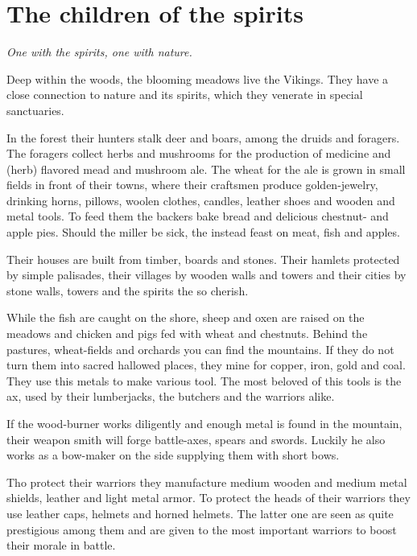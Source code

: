 \section{The children of the spirits}\label{ch:Tribes:Vikings}

\begin{flushright}
	\emph{One with the spirits, one with nature.}
\end{flushright}

Deep within the woods, the blooming meadows live the \gls*{Vikings}. They have a
close connection to nature and its spirits, which they venerate in special
sanctuaries.

In the forest their hunters stalk deer and boars, among the druids and
foragers. The foragers collect herbs and mushrooms for the production of
medicine and (herb) flavored mead and mushroom ale. The wheat for the ale is
grown in small fields in front of their towns, where their craftsmen produce
golden-jewelry, drinking horns, pillows, woolen clothes, candles, leather shoes
and wooden and metal tools. To feed them the backers bake bread and delicious
chestnut- and apple pies. Should the miller be sick, the instead feast on meat,
fish and apples.

Their houses are built from timber, boards and stones. Their hamlets protected
by simple palisades, their villages by wooden walls and towers and their cities
by stone walls, towers and the spirits the so cherish.

While the fish are caught on the shore, sheep and oxen are raised on the
meadows and chicken and pigs fed with wheat and chestnuts. Behind the pastures,
wheat-fields and orchards you can find the mountains. If they do not turn them
into sacred hallowed places, they mine for copper, iron, gold and coal. They
use this metals to make various tool. The most beloved of this tools is the ax,
used by their lumberjacks, the butchers and the warriors alike.

If the wood-burner works diligently and enough metal is found in the mountain,
their weapon smith will forge battle-axes, spears and swords. Luckily he also
works as a bow-maker on the side supplying them with short bows.

Tho protect their warriors they manufacture medium wooden and medium metal
shields, leather and light metal armor. To protect the heads of their warriors
they use leather caps, helmets and horned helmets. The latter one are seen as
quite prestigious among them and are given to the most important warriors to
boost their morale in battle.

